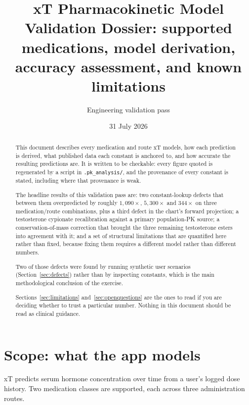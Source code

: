 \documentclass[11pt,a4paper]{article}
\title{\textbf{xT Pharmacokinetic Model}\\[0.3em]
       \large Validation Dossier: supported medications, model derivation,\\
       accuracy assessment, and known limitations}
\author{Engineering validation pass}
\date{31 July 2026}
\newcommand{\code}[1]{\texttt{\small #1}}
\begin{document}
\maketitle

\begin{abstract}
\noindent
This document describes every medication and route xT models, how each
prediction is derived, what published data each constant is anchored to, and how
accurate the resulting predictions are. It is written to be checkable: every
figure quoted is regenerated by a script in \code{.pk\_analysis/}, and the
provenance of every constant is stated, including where that provenance is weak.

The headline results of this validation pass are: two constant-lookup defects that
between them overpredicted by roughly $1{,}090\times$, $5{,}300\times$ and
$344\times$ on three medication/route combinations, plus a third defect in the
chart's forward projection; a testosterone cypionate recalibration against a
primary population-PK source; a conservation-of-mass correction that brought the
three remaining testosterone esters into agreement with it; and a set of
structural limitations that are quantified here rather than fixed, because fixing
them requires a different model rather than different numbers.

Two of those defects were found by running synthetic user scenarios
(Section~\ref{sec:defects}) rather than by inspecting constants, which is the main
methodological conclusion of the exercise.

Sections~\ref{sec:limitations} and~\ref{sec:openquestions} are the ones to read
if you are deciding whether to trust a particular number. Nothing in this document
should be read as clinical guidance.
\end{abstract}

\tableofcontents
\clearpage

\section{Scope: what the app models}

xT predicts serum hormone concentration over time from a user's logged dose
history. Two medication classes are supported, each across three administration
routes.
\end{document}
